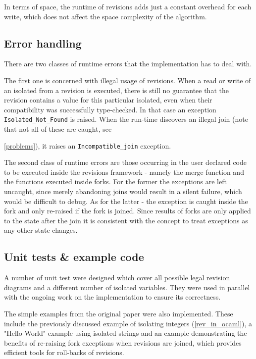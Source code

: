 \documentclass[12pt,twoside,notitlepage]{report}
\begin{document}
{In terms of space, the runtime of revisions adds just a constant overhead for each write, which does not affect the space complexity of the algorithm.     

    

\subsection{Error handling}
\label{errors}
There are two classes of runtime errors that the implementation has to deal with.
 
The first one is concerned with illegal usage of revisions. When a read or write of an isolated from a revision is executed, there is still no guarantee that the revision contains a value for this particular isolated, even when their compatibility was successfully type-checked. In that case an exception {\tt Isolated\_Not\_Found} is raised. When the run-time discovers an illegal join (note that not all of these are caught, see {\ref{problems}), it raises an {\tt Incompatible\_join} exception.

The second class of runtime errors are those occurring in the user declared code to be executed inside the revisions framework - namely the merge function and the functions executed inside forks. For the former the exceptions are left uncaught, since merely abandoning joins would result in a silent failure, which would be difficult to debug. As for the latter - the exception is caught inside the fork and only re-raised if the fork is joined. Since results of forks are only applied to the state after the join it is consistent with the concept to treat exceptions as any other state changes.  
 
\subsection{Unit tests \& example code}
 A number of unit test were designed which cover all possible legal revision diagrams and a different number of isolated variables. They were used in parallel with the ongoing work on the implementation to ensure its correctness. 
 
 The simple examples from the original paper were also implemented. These include the previously discussed example of isolating integers (\ref{rev_in_ocaml}), a "Hello World" example using isolated strings and an example demonstrating the benefits of re-raising fork exceptions when revisions are joined, which provides efficient tools for roll-backs of revisions.
  
}}
\end{document}
